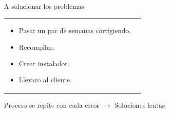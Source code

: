 \begin{frame}{A solucionar los problemas}
  \begin{tabular}{l l}
    \parbox{0.5\textwidth}{
      \begin{itemize}
        \item Pasar un par de semanas corrigiendo.
        \item Recompilar.
        \item Crear instalador.
        \item Llevaro al cliente.
      \end{itemize}
    } &
     \\
  \end{tabular} \pause
  \begin{center}
    Proceso se repite con cada error \pause $\rightarrow$ Soluciones lentas
  \end{center}
\end{frame}

